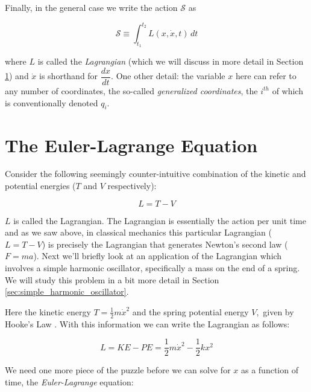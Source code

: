 \documentclass{article}
\theoremstyle{definition}
\begin{document}
\bigskip
\noindent
Finally, in the general case we write the action $\mathcal{S}$ as 

\bigskip
\begin{equation*}
\mathcal{S} \equiv \int_{t_1}^{t_2} L(x,\dot{x},t) \, dt
\end{equation*}

\bigskip
{
\noindent
where $L$ is called the \emph{Lagrangian} (which we will discuss
in more detail in Section \ref{sec:euler_lagrange}) and $\dot{x}$
is shorthand for $\dfrac{dx}{dt}$. One other detail: the variable
$x$ here can refer to any number of coordinates, the so-called
\emph{generalized coordinates}, the $i^{th}$ of which is
conventionally denoted  $q_i$. \par } 


\section{The Euler-Lagrange Equation}
\label{sec:euler_lagrange}
Consider the following seemingly counter-intuitive combination of
the kinetic and potential energies ($T$ and $V$ respectively): 

\begin{equation}
L = T  - V
\label{eqn:lagrangian}
\end{equation}

\medskip 
\noindent
$L$ is called the Lagrangian.  The Lagrangian is essentially the
action per unit time and as we saw above,  in classical mechanics
this particular Lagrangian ($L = T - V$) is precisely the
Lagrangian that generates Newton’s second law ($F = ma$). Next
we'll briefly look at an application of the Lagrangian which
involves a simple harmonic oscillator, specifically a mass on the
end of a spring. We will study this problem in a bit more detail
in Section \ref{sec:simple_harmonic_oscillator}.

\bigskip
\noindent
Here the kinetic energy $T = \frac{1}{2} m \dot{x}^2$ and the
spring potential energy $V,$ given by Hooke's Law
\cite{wiki:hookes_law}. With this information we can write 
the Lagrangian as follows: 

\medskip
\begin{equation*}
L = KE - PE = \dfrac{1}{2} m \dot{x}^2 - \dfrac{1}{2} k x^2
\end{equation*}

\bigskip
\noindent
We need one more piece of the puzzle before we can solve for $x$
as a function of time, the  \emph{Euler-Lagrange} equation: 
\end{document}
